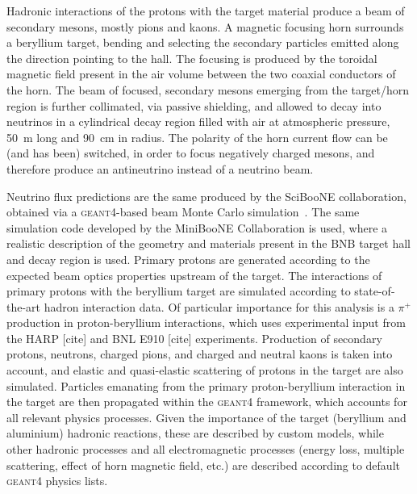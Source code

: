  Hadronic interactions of the protons with the target material produce a beam of %
 secondary mesons, mostly pions and kaons. 
 A magnetic focusing horn surrounds a beryllium target, %
 bending and selecting the secondary particles emitted along the direction pointing to the hall.
 The focusing is produced by the toroidal magnetic field present in the air volume %
 between the two coaxial conductors of the horn.
 The beam of focused, secondary mesons emerging from the target/horn region is further collimated, %
 via passive shielding, and allowed to decay into neutrinos in a cylindrical decay %
 region filled with air at atmospheric pressure, 50~m long and 90~cm in radius. 
 The polarity of the horn current flow can be (and has been) switched, in order to %
 focus negatively charged mesons, and therefore produce an antineutrino instead of a neutrino beam.

 Neutrino flux predictions are the same produced by the SciBooNE collaboration, obtained via a %
 \textsc{geant4}-based beam Monte Carlo simulation~\cite{Aguilar-Arevalo2010}.
 The same simulation code developed by the MiniBooNE Collaboration is used, %
 where a realistic description of the geometry and materials present %
 in the BNB target hall and decay region is used.
 Primary protons are generated according to the expected beam optics properties upstream 
 of the target.
 The interactions of primary protons with the beryllium target are simulated according %
 to state-of-the-art hadron interaction data. 
 Of particular importance for this analysis is a $\pi^+$ production in proton-beryllium interactions, %
 which uses experimental input from the HARP [cite] and BNL E910 [cite] experiments. 
 Production of secondary protons, neutrons, charged pions, and charged and neutral %
 kaons is taken into account, and elastic and quasi-elastic scattering of protons in the target %
 are also simulated.
 Particles emanating from the primary proton-beryllium interaction in the target are %
 then propagated within the \textsc{geant4} framework, which accounts for all relevant %
 physics processes. 
 Given the importance of the target (beryllium and aluminium) hadronic reactions, these are %
 described by custom models, while other hadronic processes %
 and all electromagnetic processes (energy loss, multiple scattering, %
 effect of horn magnetic field, etc.) are described according to default \textsc{geant4} physics lists.
 
